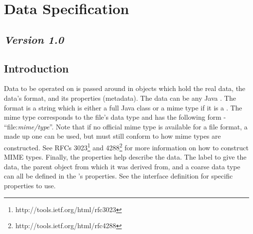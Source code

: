 \section{Data Specification}
\label{dataSpec}
\subsection*{\textit{Version 1.0}}
\subsection{Introduction}

Data to be operated on is passed around in  objects which hold the
real data, the data's format, and its properties (metadata). The data can be any
Java . The format is a string which is either a full Java class or
a mime type if it is a . The mime type corresponds to the
file's data type and has the following form - ``file:\textit{mime/type}''. Note
that if no official mime type is available for a file format, a made up one can
be used, but must still conform to how mime types are constructed. See RFCs
3023\footnote{http://tools.ietf.org/html/rfc3023} and
4288\footnote{http://tools.ietf.org/html/rfc4288} for more information on how to
construct MIME types. Finally, the properties help describe the data. The label to give the data, the parent  object from which it was derived from, and a coarse data type can
all be defined in the 's properties. See the 
interface definition for specific properties to use.
